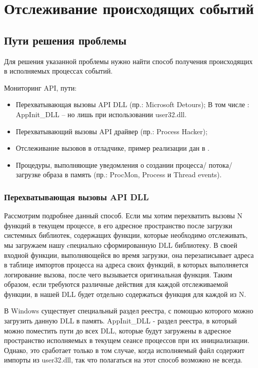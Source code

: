 \section {Отслеживание происходящих событий}
\subsection {Пути решения проблемы}
Для решения указанной проблемы нужно найти способ получения происходящих в исполняемых процессах событий. 

Мониторинг API, пути:
\begin {itemize}
	\item Перехватывающая вызовы API DLL (пр.: Microsoft Detours);
	В том числе : AppInit\_DLL – но лишь при использовании user32.dll.
	\item Перехватывающий вызовы API драйвер (пр.: Process Hacker);
	\item Отслеживание вызовов в отладчике, пример реализации дан в \cite{MALWAREBOOK}.
	\item Процедуры, выполняющие уведомления о создании процесса/ потока/ загрузке образа в память (пр.:
 	ProcMon, Process и Thread events).
\end {itemize}

\subsubsection {Перехватывающая вызовы API DLL}
Рассмотрим подробнее данный способ. Если мы хотим перехватить вызовы N функций в текущем процессе,
 в его адресное пространство после загрузки системных библиотек, содержащих функции, которые необходимо
 отслеживать, мы загружаем нашу cпециально сформированную DLL библиотеку. В своей входной функции,
 выполняющейся во время загрузки, она перезаписывает адреса в таблице импортов процесса на адреса своих
 функций, в которых выполняется логирование вызова, после чего вызывается оригинальная функция. Таким образом, если требуются различные действия для каждой отслеживаемой функции, в нашей DLL будет отдельно
 содержаться функция для каждой из N.
 
В Windows существует специальный раздел реестра, с помощью которого можно загрузить данную DLL в память. AppInit\_DLL - раздел реестра, в который можно поместить пути до всех DLL, которые будут загружены в адресное пространство исполняемых в текущем сеансе процессов при их инициализации. Однако, это сработает только в том случае, когда исполняемый файл содержит импорты из user32.dll, так что полагаться на этот способ возможно не всегда.
